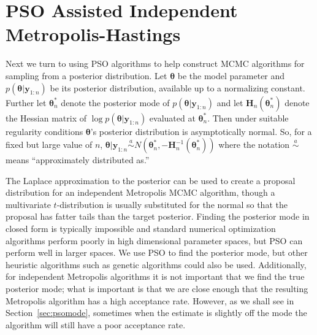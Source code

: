 \documentclass[12pt]{article}
\begin{document}
\section{PSO Assisted Independent Metropolis-Hastings}\label{sec:psometrop}
Next we turn to using PSO algorithms to help construct MCMC algorithms for sampling from a posterior distribution. Let $\bm{\theta}$ be the model parameter and $ p(\bm{\theta}|\bm{y}_{1:n})$ be its posterior distribution, available up to a normalizing constant. Further let $\bm{\theta}^*_n$ denote the posterior mode of $p(\bm{\theta}|\bm{y}_{1:n})$ and let $\bm{H}_n(\bm{\theta}^*_n)$ denote the Hessian matrix of $\log p(\bm{\theta}|\bm{y}_{1:n})$ evaluated at $\bm{\theta}_n^*$. Then under suitable regularity conditions \citep[Sections~7.4.2~and~7.4.3]{schervish1997theory} $\bm{\theta}$'s posterior distribution is asymptotically normal. So, for a fixed but large value of $n$, $\bm{\theta}|\bm{y}_{1:n} \stackrel{a}{\sim} N(\bm{\theta}_n^*, -\bm{H}_n^{-1}(\bm{\theta}^*_n))$ where the notation $\stackrel{a}{\sim}$ means ``approximately distributed as.''

The Laplace approximation to the posterior can be used to create a proposal distribution for an independent Metropolis MCMC algorithm, though a multivariate $t$-distribution is usually substituted for the normal so that the proposal has fatter tails than the target posterior.  Finding the posterior mode in closed form is typically impossible and standard numerical optimization algorithms perform poorly in high dimensional parameter spaces, but PSO can perform well in larger spaces. We use PSO to find the posterior mode, but other heuristic algorithms such as genetic algorithms \citep{goldberg1988genetic} could also be used. Additionally, for independent Metropolis algorithms it is not important that we find the true posterior mode; what is important is that we are close enough that the resulting Metropolis algorithm has a high acceptance rate. However, as we shall see in Section~\ref{sec:psomode}, sometimes when the estimate is slightly off the mode the algorithm will still have a poor acceptance rate. 
\end{document}
